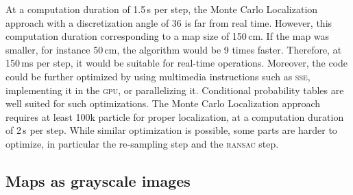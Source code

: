 \documentclass[letterpaper, 10pt, conference]{ieeeconf}
\begin{document}
At a computation duration of 1.5\,s per step, the Monte Carlo Localization approach with a discretization angle of 36 is far from real time.
However, this computation duration corresponding to a map size of 150\,cm.
If the map was smaller, for instance 50\,cm, the algorithm would be 9 times faster.
Therefore, at 150\,ms per step, it would be suitable for real-time operations.
Moreover, the code could be further optimized by using multimedia instructions such as \textsc{sse}, implementing it in the \textsc{gpu}, or parallelizing it.
Conditional probability tables are well suited for such optimizations.
The Monte Carlo Localization approach requires at least 100k particle for proper localization, at a computation duration of 2\,s per step.
While similar optimization is possible, some parts are harder to optimize, in particular the re-sampling step and the \textsc{ransac} step.

\subsection{Maps as grayscale images}
\end{document}
